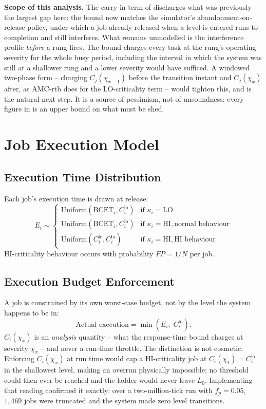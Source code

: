 \textbf{Scope of this analysis.} The carry-in term of 
discharges what was previously the largest gap here: the bound now matches the
simulator's abandonment-on-release policy, under which a job already released
when a level is entered runs to completion and still interferes. What remains
unmodelled is the interference profile \emph{before} a rung fires. The bound
charges every task at the rung's operating severity for the whole busy period,
including the interval in which the system was still at a shallower rung and a
lower severity would have sufficed. A windowed two-phase form -- charging
$C_j(\chi_{x-1})$ before the transition instant and $C_j(\chi_x)$ after, as
AMC-rtb does for the LO-criticality term -- would tighten this, and is the
natural next step. It is a source of pessimism, not of unsoundness: every
figure in  is an upper bound on what must be shed.

\section{Job Execution Model}

\subsection{Execution Time Distribution}

Each job's execution time is drawn at release:
\[
E_i \sim
\begin{cases}
\mathrm{Uniform}(\mathrm{BCET}_i, C_i^{\mathrm{lo}}) & \text{if } \kappa_i = \mathrm{LO} \\
\mathrm{Uniform}(\mathrm{BCET}_i, C_i^{\mathrm{lo}}) & \text{if } \kappa_i = \mathrm{HI}, \text{normal behaviour} \\
\mathrm{Uniform}(C_i^{\mathrm{lo}}, C_i^{\mathrm{hi}}) & \text{if } \kappa_i = \mathrm{HI}, \text{HI behaviour}
\end{cases}
\]
HI-criticality behaviour occurs with probability $FP = 1/N$ per job.

\subsection{Execution Budget Enforcement}

A job is constrained by its own worst-case budget, not by the level the system
happens to be in:
\[
\text{Actual execution} = \min\!\left(E_i,\; C_i^{\mathrm{hi}}\right).
\]
$C_i(\chi_x)$ is an \emph{analysis} quantity -- what the response-time bound
charges at severity $\chi_x$ -- and never a run-time throttle. The distinction
is not cosmetic. Enforcing $C_i(\chi_x)$ at run time would cap a HI-criticality
job at $C_i(\chi_1) = C_i^{\mathrm{lo}}$ in the shallowest level, making an
overrun physically impossible; no threshold could then ever be reached and the
ladder would never leave $L_0$. Implementing that reading confirmed it exactly:
over a two-million-tick run with $f_p = 0.05$, $1{,}469$ jobs were truncated
and the system made zero level transitions.

